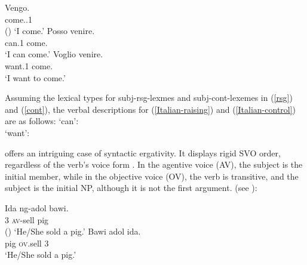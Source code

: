 \eal
\ex 
\label{Italian}
\gll Vengo.\\
     come.\PRS.1\SG\\\hfill()
\glt `I come.'
\ex 
\label{Italian-raising}
\gll Posso venire.\\
     can.1\SG{} come.\INF\\
\glt `I can come.'
\ex 
\label{Italian-control}
\gll Voglio venire.\\ 
     want.1\SG{} come.\INF\\
\glt `I want to come.'
\zl

Assuming the lexical types for subj-rsg-lexmes and subj-cont-lexemes in (\ref{rsg}) and
(\ref{cont}), the verbal descriptions for (\ref{Italian-raising}) and (\ref{Italian-control}) are as
follows:
\eal
\ex	
{} `can':\\
\label{rais1}
\ex 
{} `want':\\
\zl


 offers an intriguing case of syntactic ergativity. It displays rigid SVO order,
regardless of the verb's voice form \citep{WechslerandArka1998}. In the agentive voice (AV), the
subject is the \argst initial member, while in the objective voice (OV), the verb is transitive, and
the subject is the initial NP, although it is not the first argument.  (see
):

\eal
\ex  
\gll Ida ng-adol bawi.\\
     3\SG{} \textsc{av}-sell pig\\ \hfill()
\glt `He/She sold a pig.'
\ex 
\gll Bawi adol ida.\\
     pig \textsc{ov}.sell 3\SG \\
\glt `He/She sold a pig.' 
\zl

